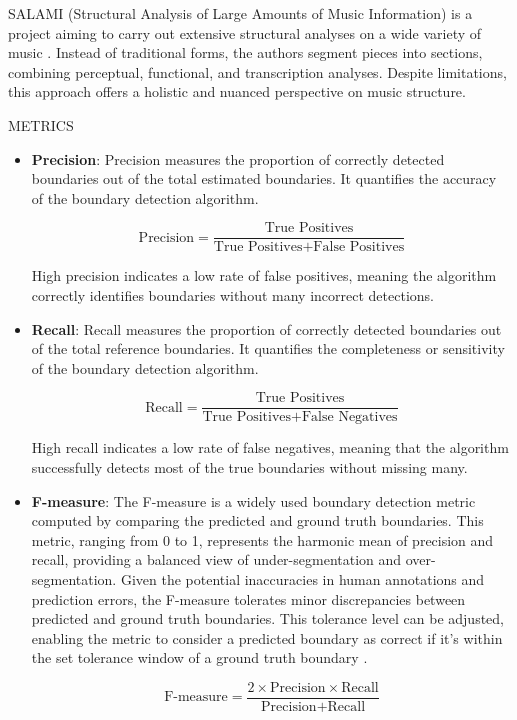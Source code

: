 
SALAMI (Structural Analysis of Large Amounts of Music Information) is a project aiming to carry out extensive structural analyses on a wide variety of music \cite{Smith2011DESIGNANNOTATIONS}. Instead of traditional forms, the authors segment pieces into sections, combining perceptual, functional, and transcription analyses. Despite limitations, this approach offers a holistic and nuanced perspective on music structure.

METRICS

\begin{itemize}
    \item \textbf{Precision}: Precision measures the proportion of correctly detected boundaries out of the total estimated boundaries. It quantifies the accuracy of the boundary detection algorithm.
    
    \[
    \text{Precision} = \frac{\text{True Positives}}{\text{True Positives} + \text{False Positives}}
    \]
    
    High precision indicates a low rate of false positives, meaning the algorithm correctly identifies boundaries without many incorrect detections.
    
    \item \textbf{Recall}: Recall measures the proportion of correctly detected boundaries out of the total reference boundaries. It quantifies the completeness or sensitivity of the boundary detection algorithm.
    
    \[
    \text{Recall} = \frac{\text{True Positives}}{\text{True Positives} + \text{False Negatives}}
    \]
    
    High recall indicates a low rate of false negatives, meaning that the algorithm successfully detects most of the true boundaries without missing many.
    
    \item \textbf{F-measure}: The F-measure is a widely used boundary detection metric computed by comparing the predicted and ground truth boundaries. This metric, ranging from 0 to 1, represents the harmonic mean of precision and recall, providing a balanced view of under-segmentation and over-segmentation. Given the potential inaccuracies in human annotations and prediction errors, the F-measure tolerates minor discrepancies between predicted and ground truth boundaries. This tolerance level can be adjusted, enabling the metric to consider a predicted boundary as correct if it's within the set tolerance window of a ground truth boundary \cite{Turnbull2007ABOOSTING}. 
    
    \[
    \text{F-measure} = \frac{2 \times \text{Precision} \times \text{Recall}}{\text{Precision} + \text{Recall}}
    \]
\end{itemize}

